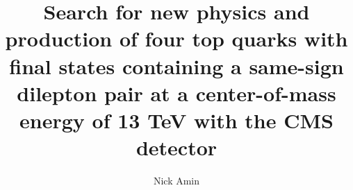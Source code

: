 

\title{
Search for new physics and production of four top quarks with final states 
containing a same-sign dilepton pair at a center-of-mass energy of 13 TeV with the CMS detector
}

\author{Nick Amin}

   


